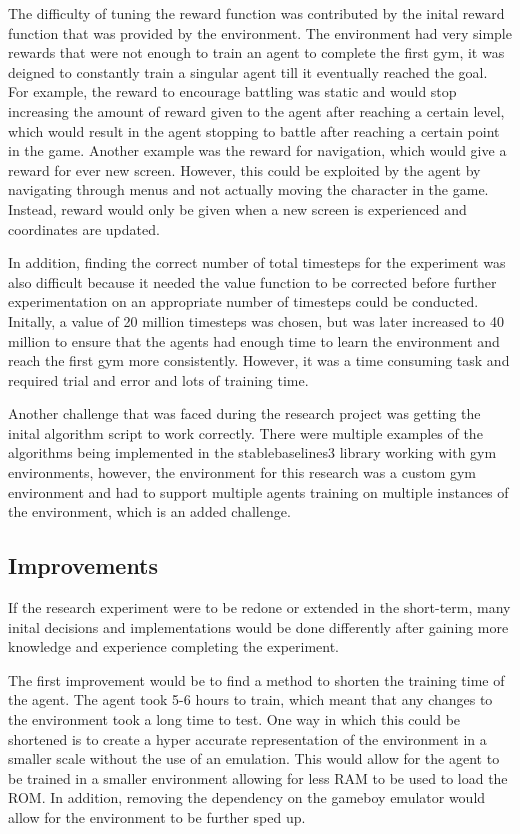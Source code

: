 The difficulty of tuning the reward function was contributed by the inital reward function that was provided by the environment. The environment had very simple rewards that were not enough to train an agent to complete the first gym, it was deigned to constantly train a singular agent till it eventually reached the goal. For example, the reward to encourage battling was static and would stop increasing the amount of reward given to the agent after reaching a certain level, which would result in the agent stopping to battle after reaching a certain point in the game. Another example was the reward for navigation, which would give a reward for ever new screen. However, this could be exploited by the agent by navigating through menus and not actually moving the character in the game. Instead, reward would only be given when a new screen is experienced and coordinates are updated. 

In addition, finding the correct number of total timesteps for the experiment was also difficult because it needed the value function to be corrected before further experimentation on an appropriate number of timesteps could be conducted. Initally, a value of 20 million timesteps was chosen, but was later increased to 40 million to ensure that the agents had enough time to learn the environment and reach the first gym more consistently. However, it was a time consuming task and required trial and error and lots of training time.

Another challenge that was faced during the research project was getting the inital algorithm script to work correctly. There were multiple examples of the algorithms being implemented in the stablebaselines3 library working with gym environments, however, the environment for this research was a custom gym environment and had to support multiple agents training on multiple instances of the environment, which is an added challenge. 

\subsection{Improvements}

If the research experiment were to be redone or extended in the short-term, many inital decisions and implementations would be done differently after gaining more knowledge and experience completing the experiment. 

The first improvement would be to find a method to shorten the training time of the agent. The agent took 5-6 hours to train, which meant that any changes to the environment took a long time to test. One way in which this could be shortened is to create a hyper accurate representation of the environment in a smaller scale without the use of an emulation. This would allow for the agent to be trained in a smaller environment allowing for less RAM to be used to load the ROM. In addition, removing the dependency on the gameboy emulator would allow for the environment to be further sped up. 

